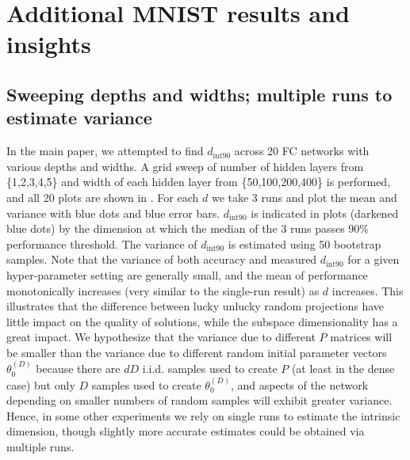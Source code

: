 \documentclass{article} %
\newcommand{\thetaDo}{\theta^{(D)}_0}
\newcommand{\dintn}{d_{\mathrm{int90}}}
\begin{document}
\noindent\makebox[\linewidth]{\rule{\linewidth}{1pt}}




\section{Additional MNIST results and insights}


\subsection{Sweeping depths and widths; multiple runs to estimate variance}


In the main paper, we attempted to find $\dintn$ across 20 FC networks with various depths and widths.
A grid sweep of number of hidden layers from \{1,2,3,4,5\} and width of each hidden layer from \{50,100,200,400\} is performed, and all 20 plots are shown in . For each $d$ we take 3 runs and plot the mean and variance with blue dots and blue error bars. $\dintn$ is indicated in plots (darkened blue dots) by the dimension at which the median of the 3 runs passes 90\% performance threshold. The variance of $\dintn$ is estimated  using 50 bootstrap samples.
Note that the variance of both accuracy and measured $\dintn$ for a given hyper-parameter setting are generally small, and the mean of performance monotonically increases (very similar to the single-run result) as $d$ increases. This
illustrates that the difference between lucky \vs unlucky random projections have little
impact on the quality of solutions, while the subspace dimensionality has a great impact.
We hypothesize that the variance due to different $P$ matrices will be smaller than the variance due to
different random initial parameter vectors $\thetaDo$ because there are $dD$ i.i.d. samples used to create $P$ (at least in the dense case) but only $D$ samples used to create $\thetaDo$, and aspects of the network depending on smaller numbers of random samples will exhibit greater variance.
Hence, in some other experiments we rely on single runs to estimate the intrinsic dimension, though slightly more accurate estimates could be obtained via multiple runs.
\end{document}
